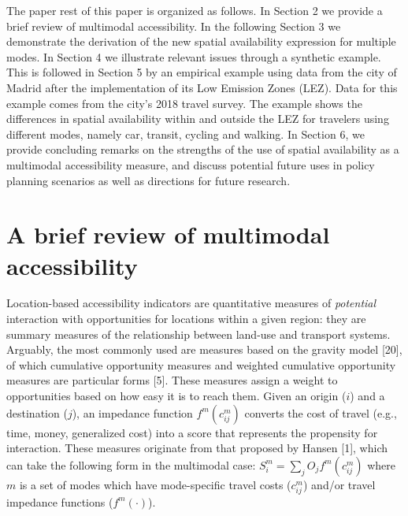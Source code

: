 \documentclass[10pt,letterpaper]{article}
\begin{document}
The paper rest of this paper is organized as follows. In Section 2 we
provide a brief review of multimodal accessibility. In the following
Section 3 we demonstrate the derivation of the new spatial availability
expression for multiple modes. In Section 4 we illustrate relevant
issues through a synthetic example. This is followed in Section 5 by an
empirical example using data from the city of Madrid after the
implementation of its Low Emission Zones (LEZ). Data for this example
comes from the city's 2018 travel survey. The example shows the
differences in spatial availability within and outside the LEZ for
travelers using different modes, namely car, transit, cycling and
walking. In Section 6, we provide concluding remarks on the strengths of
the use of spatial availability as a multimodal accessibility measure,
and discuss potential future uses in policy planning scenarios as well
as directions for future research.

\hypertarget{a-brief-review-of-multimodal-accessibility}{%
\section{A brief review of multimodal
accessibility}\label{a-brief-review-of-multimodal-accessibility}}

Location-based accessibility indicators are quantitative measures of
\emph{potential} interaction with opportunities for locations within a
given region: they are summary measures of the relationship between
land-use and transport systems. Arguably, the most commonly used are
measures based on the gravity model {[}20{]}, of which cumulative
opportunity measures and weighted cumulative opportunity measures are
particular forms {[}5{]}. These measures assign a weight to
opportunities based on how easy it is to reach them. Given an origin
(\(i\)) and a destination (\(j\)), an impedance function
\(f^{m}(c^m_{ij})\) converts the cost of travel (e.g., time, money,
generalized cost) into a score that represents the propensity for
interaction. These measures originate from that proposed by Hansen
{[}1{]}, which can take the following form in the multimodal case:
\(S_i^m = \sum_j O_j f^m(c_{ij}^m)\) where \(m\) is a set of modes which
have mode-specific travel costs (\(c_{ij}^m\)) and/or travel impedance
functions (\(f^m(\cdot)\)).
\end{document}
